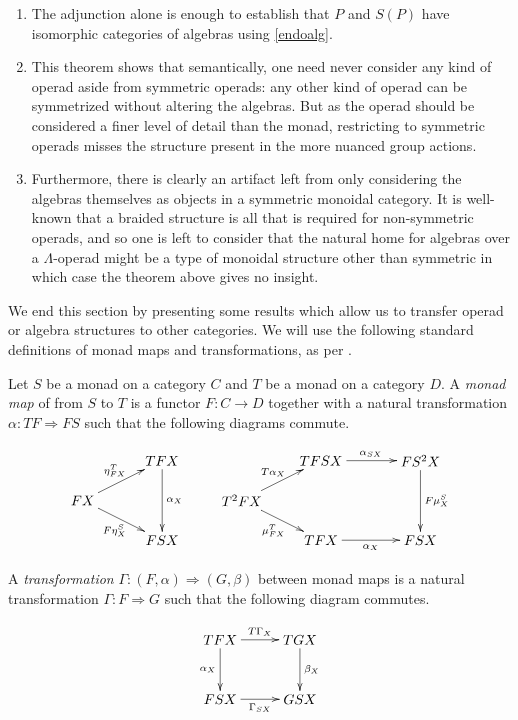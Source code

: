 \begin{rem}
\begin{enumerate}
\item The adjunction alone is enough to establish that $P$ and $S(P)$ have isomorphic categories of algebras using \cref{endoalg}.
\item This theorem shows that semantically, one need never consider any kind of operad aside from symmetric operads: any other kind of operad can be symmetrized without altering the algebras. But as the operad should be considered a finer level of detail than the monad, restricting to symmetric operads misses the structure present in the more nuanced group actions.

\item Furthermore, there is clearly an artifact left from only considering the algebras themselves as objects in a symmetric monoidal category. It is well-known that a braided structure is all that is required for non-symmetric operads, and so one is left to consider that the natural home for algebras over a $\Lambda$-operad might be a type of monoidal structure other than symmetric in which case the theorem above gives no insight.
\end{enumerate}
\end{rem}

We end this section by presenting some results which allow us to transfer operad or algebra structures to other categories. We will use the following standard definitions of monad maps and transformations, as per \cite{street-formal}.

\begin{Defi}\label{defi:monad_map}
Let $S$ be a monad on a category $C$ and $T$ be a monad on a category $D$. A \emph{monad map} of from $S$ to $T$ is a functor $F \colon C \rightarrow D$ together with a natural transformation $\alpha \colon TF \Rightarrow FS$ such that the following diagrams commute.

 \[
    \xy
      (0,0)*+{FX}="a";
      (20,10)*+{TFX}="b";
      (20,-10)*+{FSX}="c";
      {\ar^{\eta^T_{FX}} "a" ; "b"};
      {\ar^{\alpha_X} "b" ; "c"};
      {\ar_{F\eta^S_X} "a" ; "c"};
      (40,0)*+{T^2FX}="a";
      (60,10)*+{TFSX}="b";
      (85,10)*+{FS^2X}="c";
      (60,-10)*+{TFX}="d";
      (85,-10)*+{FSX}="e";
      {\ar^{T\alpha_X} "a" ; "b"};
      {\ar^{\alpha_{SX}} "b" ; "c"};
      {\ar^{F\mu^S_X} "c" ; "e"};
      {\ar_{\mu^T_{FX}} "a" ; "d"};
      {\ar_{\alpha_X} "d" ; "e"};
    \endxy
  \]

A \emph{transformation} $\Gamma \colon (F, \alpha) \Rightarrow (G, \beta)$ between monad maps is a natural transformation $\Gamma \colon F \Rightarrow G$ such that the following diagram commutes.
  
  \[
    \xy
      (0,0)*+{TFX}="a";
      (20,0)*+{TGX}="b";
      (0,-15)*+{FSX}="c";
      (20,-15)*+{GSX}="d";
      {\ar^{T\Gamma_X} "a" ; "b"};
      {\ar^{\beta_X} "b" ; "d"};
      {\ar_{\alpha_X} "a" ; "c"};
      {\ar_{\Gamma_{SX}} "c" ; "d"};
    \endxy
  \]
\end{Defi}


